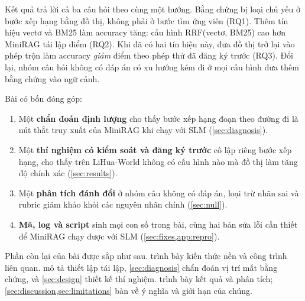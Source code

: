 Kết quả trả lời cả ba câu hỏi theo cùng một hướng.
Bằng chứng bị loại chủ yếu ở bước xếp hạng bằng đồ thị, không phải ở bước tìm ứng viên (RQ1).
Thêm tín hiệu vectơ và BM25 làm accuracy tăng: cấu hình RRF(vectơ, BM25) cao hơn MiniRAG tái lập \diffXC{} điểm (RQ2).
Khi đã có hai tín hiệu này, đưa đồ thị trở lại vào phép trộn làm accuracy \emph{giảm} \diffHC{} điểm theo phép thử đã đăng ký trước (RQ3).
Đổi lại, nhóm câu hỏi không có đáp án có xu hướng kém đi ở mọi cấu hình đưa thêm bằng chứng vào ngữ cảnh.

Bài có bốn đóng góp:
\begin{enumerate}
  \item Một \textbf{chẩn đoán định lượng} cho thấy bước xếp hạng đoạn theo đường đi là nút thắt truy xuất của MiniRAG khi chạy với SLM (\cref{sec:diagnosis}).
  \item Một \textbf{thí nghiệm có kiểm soát và đăng ký trước} cô lập riêng bước xếp hạng, cho thấy trên LiHua-World không có cấu hình nào mà đồ thị làm tăng độ chính xác (\cref{sec:results}).
  \item Một \textbf{phân tích đánh đổi} ở nhóm câu không có đáp án, loại trừ nhãn sai và rubric giám khảo khỏi các nguyên nhân chính (\cref{sec:null}).
  \item \textbf{Mã, log và script} sinh mọi con số trong bài, cùng hai bản sửa lỗi cần thiết để MiniRAG chạy được với SLM (\cref{sec:fixes,app:repro}).
\end{enumerate}
Phần còn lại của bài được sắp như sau.
 trình bày kiến thức nền và công trình liên quan.
 mô tả thiết lập tái lập, \cref{sec:diagnosis} chẩn đoán vị trí mất bằng chứng, và \cref{sec:design} thiết kế thí nghiệm.
 trình bày kết quả và phân tích; \cref{sec:discussion,sec:limitations} bàn về ý nghĩa và giới hạn của chúng.
